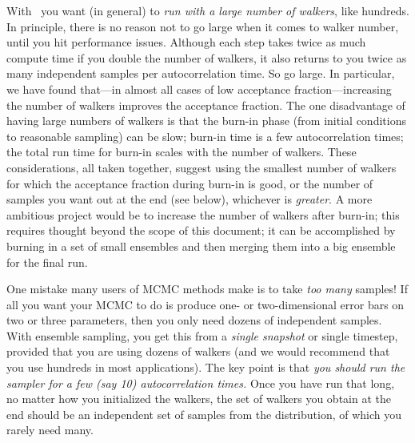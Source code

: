 With \this\  you want (in general) to \emph{run with a
  large number of walkers}, like hundreds.  In principle, there is no
reason not to go large when it comes to walker number, until you hit
performance issues.  Although each step takes twice as much compute
time if you double the number of walkers, it also returns to you twice
as many independent samples per autocorrelation time.  So go large.
In particular, we have found that---in almost all cases of low
acceptance fraction---increasing the number of walkers improves the
acceptance fraction.  The one disadvantage of having large numbers of
walkers is that the burn-in phase (from initial conditions to
reasonable sampling) can be slow; burn-in time is a few
autocorrelation times; the total run time for burn-in scales with the
number of walkers.  These considerations, all taken together, suggest
using the smallest number of walkers for which the acceptance fraction
during burn-in is good, or the number of samples you want out at the
end (see below), whichever is \emph{greater}.  A more ambitious
project would be to increase the number of walkers after burn-in; this
requires thought beyond the scope of this document; it can be
accomplished by burning in a set of small ensembles and then merging
them into a big ensemble for the final run.

One mistake many users of MCMC methods make is to take \emph{too many}
samples!  If all you want your MCMC to do is produce one- or
two-dimensional error bars on two or three parameters, then you only
need dozens of independent samples.  With ensemble sampling, you
get this from a \emph{single snapshot} or single timestep, provided
that you are using dozens of walkers (and we would recommend that you
use hundreds in most applications).  The key point is that \emph{you
  should run the sampler for a few (say 10) autocorrelation times.}
Once you have run that long, no matter how you initialized the
walkers, the set of walkers you obtain at the end should be an
independent set of samples from the distribution, of which you rarely
need many.

